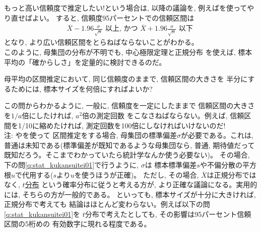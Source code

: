 もっと高い信頼度で推定したい!という場合は, 
以降の議論を, 例えばを使ってやり直せばよい。
すると, 信頼度95パーセントでの信頼区間は
\begin{eqnarray}
\overline{X}-1.96\frac{\sigma}{\sqrt{n}}\text{ 以上, かつ }\overline{X}+1.96\frac{\sigma}{\sqrt{n}}\text{ 以下  }\label{eq:stat_shinraikukan95}
\end{eqnarray}
となり, より広い信頼区間をとらねばならないことがわかる。\\

このように, 母集団の分布が不明でも, 中心極限定理と正規分布
を使えば, 標本平均の「確からしさ」を定量的に検討できるのだ。\\

\begin{q}\label{q:stat_kukansuitei02}
母平均の区間推定において, 同じ信頼度のままで, 信頼区間の大きさを
半分にするためには, 標本サイズを何倍にすればよいか?
\end{q}

この問からわかるように, 一般に, 信頼度を一定にしたままで
信頼区間の大きさを$1/a$倍にしたければ, $a^2$倍の測定回数
をこなさねばならない。例えば, 信頼区間を1/10に縮めたければ, 
測定回数を100倍にしなければいけないのだ!\\


{\small 注: やを使って
区間推定をする場合, 母集団の標準偏差$\sigma$が必要である。これは, 
普通は未知である(標準偏差が既知であるような母集団なら, 普通, 
期待値だって既知だろう。そこまでわかっていたら統計学なんか使う必要ない)。
その場合, 下の問\ref{q:stat_kukansuitei01}で行うように, $\sigma$は
標本標準偏差$s$や不偏分散の平方根$u$で代用する($s$より$u$を使うほうが正確)。
ただし, その場合, $\overline{X}$は正規分布ではなく, \underline{$t$分布}
という確率分布に従うと考える方が, 
より正確な議論になる。実用的には, そちらの方が一般的である。
といっても, 標本サイズが十分に大きければ, 正規分布で考えても
結論はほとんど変わらない。例えば以下の問\ref{q:stat_kukansuitei01}を
$t$分布で考えたとしても, その影響は95パーセント信頼区間の5桁めの
有効数字に現れる程度である。}

